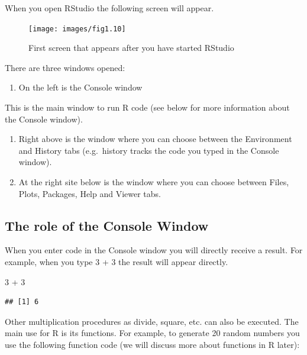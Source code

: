 \documentclass[
]{book}
\newenvironment{Shaded}{\begin{snugshade}}{\end{snugshade}}
\newcommand{\DecValTok}[1]{\textcolor[rgb]{0.00,0.00,0.81}{#1}}
\newcommand{\SpecialCharTok}[1]{\textcolor[rgb]{0.00,0.00,0.00}{#1}}
\providecommand{\tightlist}{%
  \setlength{\itemsep}{0pt}\setlength{\parskip}{0pt}}
\begin{document}
When you open RStudio the following screen will appear.

\begin{figure}

{\centering \texttt{[image: images/fig1.10]} 

}

\caption{First screen that appears after you have started RStudio}\label{fig:fig10}
\end{figure}

There are three windows opened:

\begin{enumerate}
\def\labelenumi{\arabic{enumi}.}
\tightlist
\item
  On the left is the Console window
\end{enumerate}

This is the main window to run R code (see below for more information about the Console window).

\begin{enumerate}
\def\labelenumi{\arabic{enumi}.}
\setcounter{enumi}{1}
\item
  Right above is the window where you can choose between the Environment and History tabs (e.g.~history tracks the code you typed in the Console window).
\item
  At the right site below is the window where you can choose between Files, Plots, Packages, Help and Viewer tabs.
\end{enumerate}

\hypertarget{the-role-of-the-console-window}{%
\subsection{The role of the Console Window}\label{the-role-of-the-console-window}}

When you enter code in the Console window you will directly receive a result. For example, when you type 3 + 3 the result will appear directly.

\begin{Shaded}
\begin{Highlighting}[]
\DecValTok{3} \SpecialCharTok{+} \DecValTok{3}
\end{Highlighting}
\end{Shaded}

\begin{verbatim}
## [1] 6
\end{verbatim}

Other multiplication procedures as divide, square, etc. can also be executed. The main use for R is its functions. For example, to generate 20 random numbers you use the following function code (we will discuss more about functions in R later):
\end{document}

